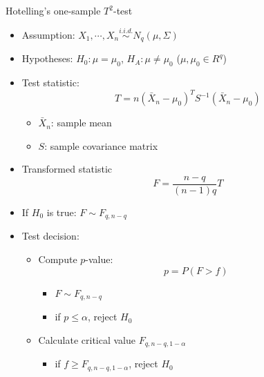 \documentclass[a4paper]{article}
\begin{document}
Hotelling's one-sample $T^2$-test
\begin{itemize}
    \item Assumption: $X_1,\cdots,X_n\overset{i.i.d.}{\sim}N_q(\mu,\Sigma)$
    \item Hypotheses: $H_0:\mu=\mu_0$, $H_A:\mu\neq\mu_0$ ($\mu,\mu_0\in R^q$)
    \item Test statistic:
    \[T=n(\bar{X}_n-\mu_0)^{T}S^{-1}(\bar{X}_n-\mu_0) \]
    \begin{itemize}
        \item $\bar{X}_n$: sample mean
        \item $S$: sample covariance matrix
    \end{itemize}
    \item Transformed statistic 
    \[F=\frac{n-q}{(n-1)q}T \]
    \item If $H_0$ is true: $F\sim F_{q,n-q}$
    \item Test decision:
    \begin{itemize}
        \item Compute $p$-value:
        \[p=P(F>f) \]
        \begin{itemize}
            \item $F\sim F_{q, n-q}$
            \item if $p\leq \alpha$, reject $H_0$
        \end{itemize}
        \item Calculate critical value $F_{q,n-q,1-\alpha}$
        \begin{itemize}
            \item if $f\geq F_{q,n-q,1-\alpha}$, reject $H_0$
        \end{itemize}
    \end{itemize}
\end{itemize}
\end{document}

